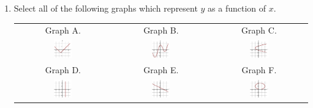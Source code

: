 \begin{enumerate}
\item  Select all of the following graphs which represent $y$ as a function of $x$.

\begin{center}
\begin{tabular}{ccc}
Graph A. & Graph B. & Graph C. \\
\includegraphics[width=0.2\textwidth]{img/chap1/sec1-2/prob4a.png} & \includegraphics[width=0.2\textwidth]{img/chap1/sec1-2/prob4b.png} &
\includegraphics[width=0.2\textwidth]{img/chap1/sec1-2/prob4c.png} \\
\midrule
Graph D. & Graph E. & Graph F. \\
\includegraphics[width=0.2\textwidth]{img/chap1/sec1-2/prob4d.png} & \includegraphics[width=0.2\textwidth]{img/chap1/sec1-2/prob4e.png} &
\includegraphics[width=0.2\textwidth]{img/chap1/sec1-2/prob4f.png} \\
\end{tabular}
\end{center}


\end{enumerate}
